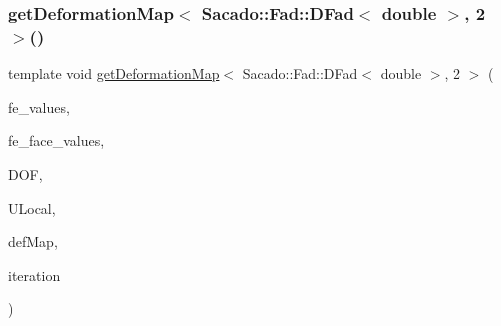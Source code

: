 \mbox{\label{function_evaluations_8cc_ad11d0f7ed38dbb3358eb93a823679880}} 
\subsubsection{\texorpdfstring{getDeformationMap$<$ Sacado::Fad::DFad$<$ double $>$, 2 $>$()}{getDeformationMap< Sacado::Fad::DFad< double >, 2 >()}\hspace{0.1cm}{\footnotesize\ttfamily [2/2]}}
{\footnotesize\ttfamily template void \mbox{\hyperlink{group___evaluation_functions_ga239b206235603af9482484c29c8d57ea}{get\+Deformation\+Map}}$<$ Sacado\+::\+Fad\+::\+D\+Fad$<$ double $>$, 2 $>$ (\begin{DoxyParamCaption}\item[{const F\+E\+Values$<$ 2 $>$ \&}]{fe\+\_\+values,  }\item[{const F\+E\+Face\+Values$<$ 2 $>$ \&}]{fe\+\_\+face\+\_\+values,  }\item[{unsigned int}]{D\+OF,  }\item[{Table$<$ 1, Sacado\+::\+Fad\+::\+D\+Fad$<$ double $>$$>$ \&}]{U\+Local,  }\item[{\mbox{\hyperlink{structdeformation_map}{deformation\+Map}}$<$ Sacado\+::\+Fad\+::\+D\+Fad$<$ double $>$, 2 $>$ \&}]{def\+Map,  }\item[{unsigned int}]{iteration }\end{DoxyParamCaption})}

\mbox{\label{function_evaluations_8cc_aed838368af3e1f968a4234eb18bee8e8}} 
